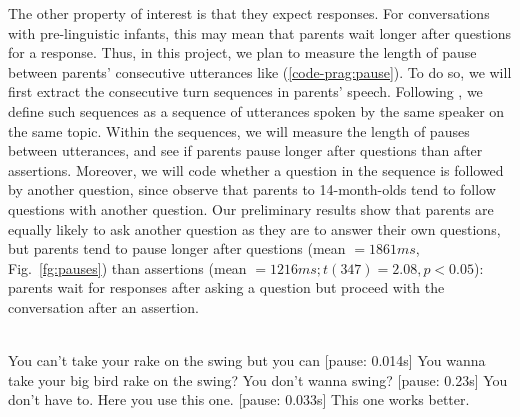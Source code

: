The other property of interest is that they expect responses. For conversations with pre-linguistic infants, this may mean that parents wait longer after questions for a response. Thus, in this project, we plan to measure the length of pause between parents’ consecutive utterances like (\ref{code-prag:pause}). To do so, we will first extract the consecutive turn sequences in parents’ speech. Following \cite{reimchen2017}, we define such sequences as a sequence of utterances spoken by the same speaker on the same topic. Within the sequences, we will measure the length of pauses between utterances, and see if parents pause longer after questions than after assertions. Moreover, we will code whether a question in the sequence is followed by another question, since \cite{reimchen2017} observe that parents to 14-month-olds tend to follow questions with another question. Our preliminary results show that parents are equally likely to ask another question as they are to answer their own questions, but parents tend to pause longer after questions (mean $= 1861ms$, Fig.~\ref{fg:pauses}) than assertions (mean $= 1216ms; t(347) = 2.08, p <0.05$): parents wait for responses after asking a question but proceed with the conversation after an assertion. 




\\ 
\bxl
\ex You can’t take your rake on the swing but you can [pause: 0.014s] You wanna take your big bird rake on the swing? 			\hfill {}
\ex You don't wanna swing? [pause: 0.23s]	You don’t have to.	\hfill {}
\ex Here you use this one. [pause: 0.033s] This one works better.	\hfill {}
\exl
\eex





